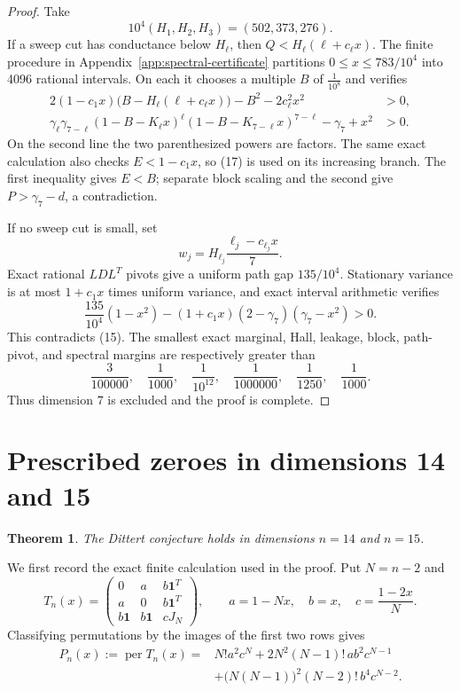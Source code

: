 \documentclass[11pt]{amsart}
\newtheorem{theorem}{Theorem}[section]
\theoremstyle{definition}
\theoremstyle{remark}
\begin{document}
\begin{proof}
Take
\[
10^4(H_1,H_2,H_3)=(502,373,276).
\]
If a sweep cut has conductance below \(H_\ell\), then
\(Q<H_\ell(\ell+c_\ell x)\).  The finite procedure in
Appendix~\ref{app:spectral-certificate} partitions
\(0\leq x\leq783/10^4\) into 4096 rational intervals. On each it chooses a
multiple \(B\) of \(\frac1{10^8}\) and verifies
\[
\begin{split}
2(1-c_1x)\bigl(B-H_\ell(\ell+c_\ell x)\bigr)
 -B^2-2c_\ell^2x^2&>0,\\
\gamma_\ell\gamma_{7-\ell}
(1-B-K_\ell x)^\ell
(1-B-K_{7-\ell}x)^{7-\ell}
 -\gamma_7+x^2&>0.
\end{split}                                         \tag{18}
\]
On the second line the two parenthesized powers are factors.  The same
exact calculation
also checks \(E<1-c_1x\), so (17) is used on its increasing branch. The
first inequality gives \(E<B\); separate block scaling and the second give
\(P>\gamma_7-d\), a contradiction.

If no sweep cut is small, set
\[
w_j=H_{\ell_j}\frac{\ell_j-c_{\ell_j}x}{7}.
\]
Exact rational \(LDL^T\) pivots give a uniform path gap \(135/10^4\).
Stationary variance is at most \(1+c_1x\) times uniform variance, and exact
interval arithmetic verifies
\[
\frac{135}{10^4}(1-x^2)
 -(1+c_1x)(2-\gamma_7)(\gamma_7-x^2)>0.
\]
This contradicts (15). The smallest exact marginal, Hall, leakage, block,
path-pivot, and spectral margins are respectively greater than
\[
\frac3{100000},\quad\frac1{1000},\quad
\frac1{10^{12}},\quad\frac1{1000000},\quad
\frac1{1250},\quad\frac1{1000}.
\]
Thus dimension \(7\) is excluded and the proof is complete.
\end{proof}

\section{Prescribed zeroes in dimensions 14 and 15}\label{sec:twozero}

\begin{theorem}\label{thm:dittert-14-15}
The Dittert conjecture holds in dimensions \(n=14\) and \(n=15\).
\end{theorem}

We first record the exact finite calculation used in the proof. Put \(N=n-2\)
and
\[
 T_n(x)=
 \begin{pmatrix}
 0&a&b\mathbf1^T\\
 a&0&b\mathbf1^T\\
 b\mathbf1&b\mathbf1&cJ_N
 \end{pmatrix},
 \qquad
 a=1-Nx,\quad b=x,\quad c=\frac{1-2x}{N}.
\]
Classifying permutations by the images of the first two rows gives
\[
\begin{split}
 P_n(x):=\operatorname{per}T_n(x)
 ={}&N!a^2c^N+2N^2(N-1)!\,ab^2c^{N-1}\\
 &+\bigl(N(N-1)\bigr)^2(N-2)!\,b^4c^{N-2}.
\end{split}
\]
\end{document}
